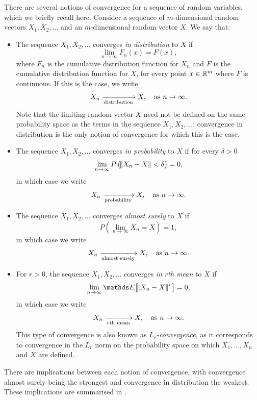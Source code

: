 There are several notions of convergence for a sequence of random variables, which we briefly recall here.
Consider a sequence of \(m\)-dimensional random vectors \(X_1, X_2,\dotsc\) and an \(m\)-dimensional random vector \(X\).
We say that:
\begin{itemize}
	\item The sequence \(X_1, X_2, \dotsc\) converges \emph{in distribution} to \(X\) if
	      \[
		      \lim_{n\to\infty}F_n\left(x\right) = F(x),
	      \]
	      where \(F_n\) is the cumulative distribution function for \(X_n\) and \(F\) is the cumulative distribution function for \(X\), for every point \(x \in \mathbb{R}^m\) where \(F\) is continuous.
	      If this is the case, we write
	      \[
		      X_n \xlongrightarrow[\text{distribution}]{} X, \quad \text{as } n \to \infty.
	      \]
	      Note that the limiting random vector \(X\) need not be defined on the same probability space as the terms in the sequence \(X_1, X_2, \dotsc\); convergence in distribution is the only notion of convergence for which this is the case.


	\item The sequence \(X_1, X_2, \dotsc\) converges \emph{in probability} to \(X\) if for every \(\delta > 0\)
	      \[
		      \lim_{n\to\infty}P\left(\norm{X_n - X} < \delta\right) = 0,
	      \]
	      in which case we write
	      \[
		      X_n \xlongrightarrow[\text{probability}]{} X, \quad \text{as } n \to \infty.
	      \]

	\item The sequence \(X_1, X_2, \dotsc\) converges \emph{almost surely} to \(X\) if
	      \[
		      P\left(\lim_{n \to \infty}X_n = X\right) = 1,
	      \]
	      in which case we write
	      \[
		      X_n \xlongrightarrow[\text{almost surely}]{} X, \quad \text{as } n \to \infty.
	      \]

	\item For \(r > 0\), the sequence \(X_1, X_2, \dotsc\) converges \emph{in \(r\)th mean} to \(X\) if
	      \[
		      \lim_{n\to\infty}{\avg{\norm{X_n - X}^r}} = 0,
	      \]
	      in which case we write
	      \[
		      X_n \xlongrightarrow[r\text{th mean}]{} X, \quad \text{as } n \to \infty.
	      \]
	      This type of convergence is also known as \emph{\(L_r\)-convergence}, as it corresponds to convergence in the \(L_r\) norm on the probability space on which \(X_1,\dotsc, X_n\) and \(X\) are defined.

\end{itemize}
There are implications between each notion of convergence, with convergence almost surely being the strongest and convergence in distribution the weakest.
These implications are summarised in .

